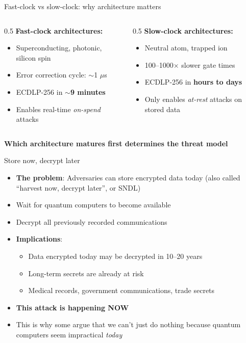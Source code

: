\ifdefined\PRESENTATION\else\PassOptionsToClass{handout}{beamer}\fi\documentclass[aspectratio=169, lualatex]{beamer}
\begin{document}
\begin{frame}{Fast-clock vs slow-clock: why architecture matters}
	\begin{columns}[c]
		\begin{column}{0.5\textwidth}
			\textbf{Fast-clock architectures:}
			\begin{itemize}
				\item Superconducting, photonic, silicon spin
				\item Error correction cycle: $\sim$1 $\mu$s
				\item ECDLP-256 in \textbf{$\sim$9 minutes}
				\item Enables real-time \textit{on-spend} attacks
			\end{itemize}
		\end{column}
		\begin{column}{0.5\textwidth}
			\textbf{Slow-clock architectures:}
			\begin{itemize}
				\item Neutral atom, trapped ion
				\item 100--1000$\times$ slower gate times
				\item ECDLP-256 in \textbf{hours to days}
				\item Only enables \textit{at-rest} attacks on stored data
			\end{itemize}
		\end{column}
	\end{columns}
	\vspace{5mm}
	\begin{center}
		\textbf{Which architecture matures first determines the threat model}
	\end{center}
\end{frame}

\begin{frame}{Store now, decrypt later}
	\begin{itemize}
		\item \textbf{The problem}: Adversaries can store encrypted data today (also called ``harvest now, decrypt later'', or SNDL)
		\item Wait for quantum computers to become available
		\item Decrypt all previously recorded communications
		\item \textbf{Implications}:
		      \begin{itemize}
			      \item Data encrypted today may be decrypted in 10--20 years
			      \item Long-term secrets are already at risk
			      \item Medical records, government communications, trade secrets
		      \end{itemize}
		\item \textbf{This attack is happening NOW}
		\item This is why some argue that we can't just do nothing because quantum computers seem impractical \textit{today}
	\end{itemize}
\end{frame}
\end{document}
